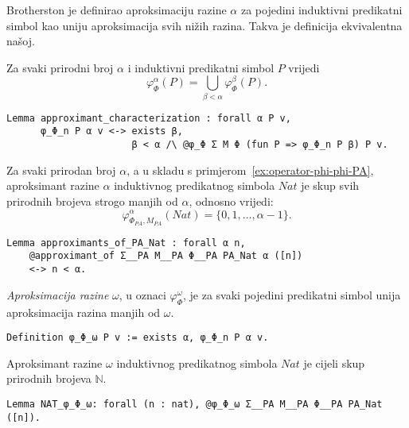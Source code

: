\begin{remark}
  Brotherston je definirao aproksimaciju razine \(\alpha\) za pojedini induktivni predikatni simbol
  kao uniju aproksimacija svih nižih razina.
  Takva je definicija ekvivalentna našoj.
\end{remark}

\begin{lemma}\label{lemma:ekvivalentnost-definicija-aproksimacija}
  Za svaki prirodni broj \(\alpha\) i induktivni predikatni simbol \(P\) vrijedi
  \[
    \varphi_{\Phi}^{\alpha}(P) = \bigcup_{\beta < \alpha} \varphi_{\Phi}^{\beta}(P).
  \]
\begin{verbatim}
Lemma approximant_characterization : forall α P v,
      φ_Φ_n P α v <-> exists β,
                      β < α /\ @φ_Φ Σ M Φ (fun P => φ_Φ_n P β) P v.
\end{verbatim}
\end{lemma}

\begin{example}
  Za svaki prirodan broj \(\alpha\), a u skladu s primjerom~\ref{ex:operator-phi-phi-PA},
  aproksimant razine \(\alpha\) induktivnog predikatnog simbola \(\mathit{Nat}\)
  je skup svih prirodnih brojeva strogo manjih od \(\alpha\), odnosno vrijedi:
  \[
    \varphi_{\Phi_{\mathit{PA}}, M_{\mathit{PA}}}^{\alpha}(\mathit{Nat}) = \{ 0, 1, \ldots, \alpha - 1 \}.
  \]
\begin{verbatim}
Lemma approximants_of_PA_Nat : forall α n,
    @approximant_of Σ__PA M__PA Φ__PA PA_Nat α ([n])
    <-> n < α.
\end{verbatim}
\end{example}

\begin{definition}
  \textit{Aproksimacija razine} \(\omega\), u oznaci \(\varphi_{\Phi}^{\omega}\), je za svaki pojedini predikatni simbol
  unija aproksimacija razina manjih od \(\omega\).
\begin{verbatim}
Definition φ_Φ_ω P v := exists α, φ_Φ_n P α v.
\end{verbatim}
\end{definition}

\begin{example}
  Aproksimant razine \(\omega\) induktivnog predikatnog simbola \(\mathit{Nat}\)
  je cijeli skup prirodnih brojeva \(\mathbb{N}\).
\begin{verbatim}
Lemma NAT_φ_Φ_ω: forall (n : nat), @φ_Φ_ω Σ__PA M__PA Φ__PA PA_Nat ([n]).
\end{verbatim}
\end{example}

